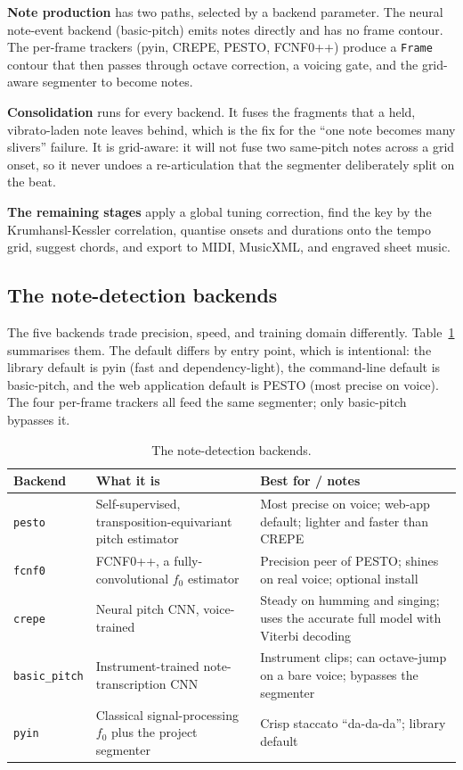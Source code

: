 \documentclass[12pt,a4paper]{article}
\begin{document}
\textbf{Note production} has two paths, selected by a backend parameter. The
neural note-event backend (basic-pitch) emits notes directly and has no frame
contour. The per-frame trackers (pyin, CREPE, PESTO, FCNF0++) produce a
\texttt{Frame} contour that then passes through octave correction, a voicing
gate, and the grid-aware segmenter to become notes.

\textbf{Consolidation} runs for every backend. It fuses the fragments that a
held, vibrato-laden note leaves behind, which is the fix for the ``one note
becomes many slivers'' failure. It is grid-aware: it will not fuse two
same-pitch notes across a grid onset, so it never undoes a re-articulation that
the segmenter deliberately split on the beat.

\textbf{The remaining stages} apply a global tuning correction, find the key by
the Krumhansl-Kessler correlation, quantise onsets and durations onto the
tempo grid, suggest chords, and export to MIDI, MusicXML, and engraved sheet
music.

\subsection{The note-detection backends}

The five backends trade precision, speed, and training domain differently.
Table~\ref{tab:backends} summarises them. The default differs by entry point,
which is intentional: the library default is pyin (fast and dependency-light),
the command-line default is basic-pitch, and the web application default is
PESTO (most precise on voice). The four per-frame trackers all feed the same
segmenter; only basic-pitch bypasses it.

\begin{table}[H]
\centering
\caption{The note-detection backends.}
\label{tab:backends}
\begin{tabular}{l p{} p{}}
\toprule
\textbf{Backend} & \textbf{What it is} & \textbf{Best for / notes} \\
\midrule
\texttt{pesto} & Self-supervised, transposition-equivariant pitch estimator &
Most precise on voice; web-app default; lighter and faster than CREPE \\
\texttt{fcnf0} & FCNF0++, a fully-convolutional $f_0$ estimator & Precision
peer of PESTO; shines on real voice; optional install \\
\texttt{crepe} & Neural pitch CNN, voice-trained & Steady on humming and
singing; uses the accurate full model with Viterbi decoding \\
\texttt{basic\_pitch} & Instrument-trained note-transcription CNN & Instrument
clips; can octave-jump on a bare voice; bypasses the segmenter \\
\texttt{pyin} & Classical signal-processing $f_0$ plus the project segmenter &
Crisp staccato ``da-da-da''; library default \\
\bottomrule
\end{tabular}
\end{table}
\end{document}
